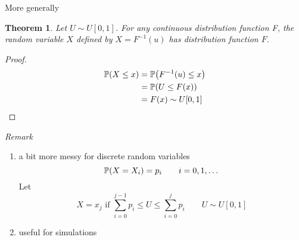 \documentclass{notes}
\theoremstyle{plain}
\newtheorem{theorem}{Theorem}[chapter]
\newcommand{\bP}{\mathbb{P}}
\newcommand{\prob}[1]{\bP \negthinspace\left(#1\right)}
\begin{document}
More generally
\begin{theorem}
Let $U \sim U[0,1]$.  For any continuous distribution function F,
the random variable $X$ defined by $X=F^{-1}(u)$ has distribution
function $F$.
\end{theorem}
\begin{proof}
\begin{align*}
  \prob{X \leq x} &= \prob{ F^{-1}(u) \leq x}\\
&= \prob{U\leq F(x)}\\
&=F(x)\sim U[0,1]
\end{align*}
\end{proof}
\emph{Remark } 
\begin{enumerate}
\item a bit more messy for discrete random variables
\[
\prob{X=X_i} =  p_i \qquad i=0,1,\dots
\]
Let 
\[
 X = x_j \text{ if } \sum_{i=0}^{j-1} p_i \leq U \le \sum_{i=0}^{j}p_i
\qquad U \sim U[0,1]
\]
\item useful for simulations
\end{enumerate}
\end{document}
